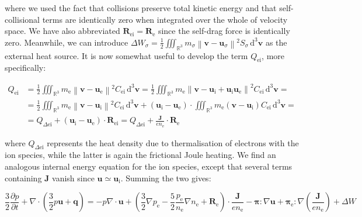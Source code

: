where we used the fact that collisions preserve total kinetic energy and that self-collisional terms are identically zero when integrated over the whole of velocity space. We have also abbreviated $\mathbf{R}_{\mathrm{ei}}=\mathbf{R}_{\mathrm{e}}$ since the self-drag force is identically zero. Meanwhile, we can introduce $\Delta W_\sigma = \frac{1}{2}\iiint_{\mathbb{R}^3}m_\sigma \left\|\mathbf{v}-\mathbf{u}_\sigma\right\|^2 S_\sigma\,\mathrm{d}^3 \mathbf{v}$ as the external heat source. It is now somewhat useful to develop the term $Q_{\mathrm{ei}}$, more specifically:

\begin{align*}
    Q_{\mathrm{ei}}&=\frac{1}{2}\iiint_{\mathbb{R}^3}m_{\mathrm{e}}\left\|\mathbf{v}-\mathbf{u}_{\mathrm{e}}\right\|^2C_{\mathrm{ei}}\,\mathrm{d}^3 \mathbf{v}=\frac{1}{2}\iiint_{\mathbb{R}^3}m_{\mathrm{e}}\left\|\mathbf{v}-\mathbf{u}_{\mathrm{i}}+\mathbf{u}_{\mathrm{i}}\mathbf{u}_{\mathrm{e}}\right\|^2C_{\mathrm{ei}}\,\mathrm{d}^3 \mathbf{v}=\\
    &=\frac{1}{2}\iiint_{\mathbb{R}^3}m_{\mathrm{e}}\left\|\mathbf{v}-\mathbf{u}_{\mathrm{i}}\right\|^2C_{\mathrm{ei}}\,\mathrm{d}^3 \mathbf{v}+(\mathbf{u}_{\mathrm{i}}-\mathbf{u}_{\mathrm{e}})\cdot\iiint_{\mathbb{R}^3}m_{\mathrm{e}}\left(\mathbf{v}-\mathbf{u}_{\mathrm{i}}\right)C_{\mathrm{ei}}\,\mathrm{d}^3 \mathbf{v}=\\
    &=Q_{\Delta \mathrm{ei}}+\left(\mathbf{u}_{\mathrm{i}}-\mathbf{u}_{\mathrm{e}}\right)\cdot \mathbf{R}_{\mathrm{ei}}=Q_{\Delta \mathrm{ei}}+\frac{\mathbf{J}}{en_{\mathrm{e}}}\cdot \mathbf{R}_{\mathrm{e}}
\end{align*}

where $Q_{\Delta{\mathrm{ei}}}$ represents the heat density due to thermalisation of electrons with the ion species, while the latter is again the frictional Joule heating. We find an analogous internal energy equation for the ion species, except that several terms containing $\mathbf{J}$ vanish since $\mathbf{u}\simeq \mathbf{u}_{\mathrm{i}}$. Summing the two gives:

\begin{equation}
    \frac{3}{2}\frac{\partial p}{\partial t}+\nabla\cdot \left(\frac{3}{2}p \mathbf{u}+\mathbf{q}\right)=-p\nabla\cdot \mathbf{u}+\left(\frac{3}{2}\nabla p_{\mathrm{e}}-\frac{5}{2}\frac{p_{\mathrm{e}}}{n_{\mathrm{e}}}\nabla n_{\mathrm{e}} + \mathbf{R}_{\mathrm{e}}\right)\cdot \frac{\mathbf{J}}{en_{\mathrm{e}}}-\boldsymbol{\pi}:\nabla \mathbf{u}+\boldsymbol{\pi}_{\mathrm{e}}:\nabla \left(\frac{\mathbf{J}}{en_{\mathrm{e}}}\right)+\Delta W
\end{equation}

